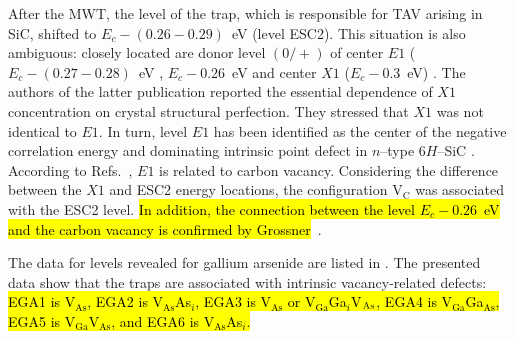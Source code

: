 \documentclass[10pt]{iopart}
\begin{document}
After the MWT, the level of the trap,
which is responsible for TAV arising in SiC,
shifted to $E_c-(0.26-0.29)$~eV (level ESC2).
This situation is also ambiguous: closely located are donor level $(0/+)$ of
center $E1$ ($E_c-(0.27-0.28)$~eV \cite{Hemmingsson},
$E_c-0.26$~eV \cite{SiCWei,SiCKoizumi}
and center $X1$ ($E_c-0.3$~eV) \cite{Lebedev2001En}.
The authors of the latter publication reported the essential dependence of $X1$ concentration on crystal structural perfection.
They stressed that $X1$ was not identical to $E1$.
In turn, level $E1$ has been identified as the center of the negative
correlation energy \cite{Lebedev2001En,SiCWei}
and dominating intrinsic point defect in $n$--type 6$H$--SiC \cite{SiCSasaki}.
According to Refs.~\cite{SiCSasaki,SiCWei}, $E1$ is related to carbon vacancy.
Considering the difference between the $X1$ and ESC2 energy locations,
the configuration $\mathrm{V}_\mathrm{C}$ was associated with the ESC2 level.
\hl{In addition, the connection between the level $E_c-0.26$~eV and the carbon vacancy
is confirmed by Grossner}~\etal \cite{SiC:bookCh6}.

The data for levels revealed for gallium arsenide are listed in .
The presented data show that the traps are associated with intrinsic vacancy-related defects:
\hl{EGA1 is V$_\mathrm{As}$,
EGA2 is V$_\mathrm{As}$As$_i$,
EGA3 is V$_\mathrm{As}$ or  V$_\mathrm{Ga}$Ga$_i$V$_{\rm As}$,
EGA4 is V$_\mathrm{Ga}$Ga$_\mathrm{As}$,
EGA5 is V$_\mathrm{Ga}$V$_\mathrm{As}$,
and EGA6 is V$_\mathrm{As}$As$_i$.}
\end{document}
